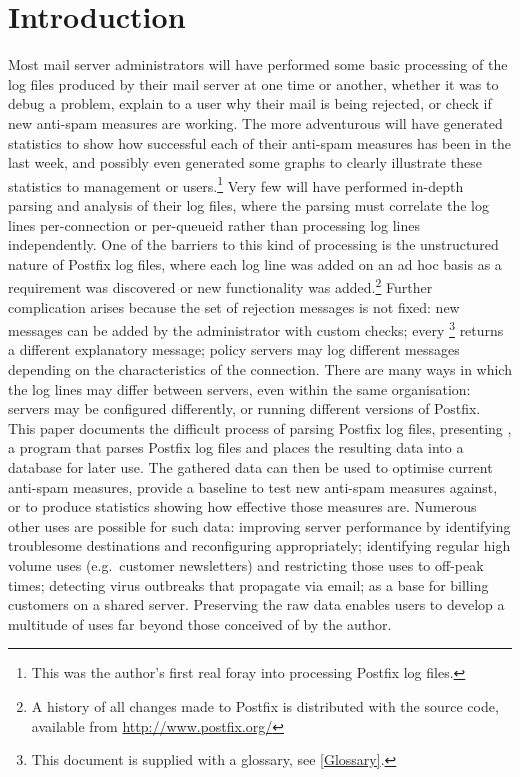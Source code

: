 \section{Introduction}

\label{introduction}

Most mail server administrators will have performed some basic processing
of the log files produced by their mail server at one time or another,
whether it was to debug a problem, explain to a user why their mail is
being rejected, or check if new anti-spam measures are working.  The more
adventurous will have generated statistics to show how successful each of
their anti-spam measures has been in the last week, and possibly even
generated some graphs to clearly illustrate these statistics to management
or users.\footnote{This was the author's first real foray into processing
Postfix log files.}  Very few will have performed in-depth parsing and
analysis of their log files, where the parsing must correlate the log lines
per-connection or per-queueid rather than processing log lines
independently.  One of the barriers to this kind of processing is the
unstructured nature of Postfix log files, where each log line was added on
an ad hoc basis as a requirement was discovered or new functionality was
added.\footnote{A history of all changes made to Postfix is distributed
with the source code, available from \url{http://www.postfix.org/}} Further
complication arises because the set of rejection messages is not fixed: new
messages can be added by the administrator with custom checks; every
\DNSBL{}\footnote{This document is supplied with a glossary, see
\textsection\ref{Glossary}.} returns a different explanatory message;
policy servers may log different messages depending on the characteristics
of the connection.  There are many ways in which the log lines may differ
between servers, even within the same organisation: servers may be
configured differently, or running different versions of Postfix.  This
paper documents the difficult process of parsing Postfix log files,
presenting \PLP{}, a program that parses Postfix log files and places the
resulting data into a database for later use.  The gathered data can then
be used to optimise current anti-spam measures, provide a baseline to test
new anti-spam measures against, or to produce statistics showing how
effective those measures are.  Numerous other uses are possible for such
data: improving server performance by identifying troublesome destinations
and reconfiguring appropriately; identifying regular high volume uses
(e.g.\ customer newsletters) and restricting those uses to off-peak times;
detecting virus outbreaks that propagate via email; as a base for billing
customers on a shared server.  Preserving the raw data enables users to
develop a multitude of uses far beyond those conceived of by the author.

